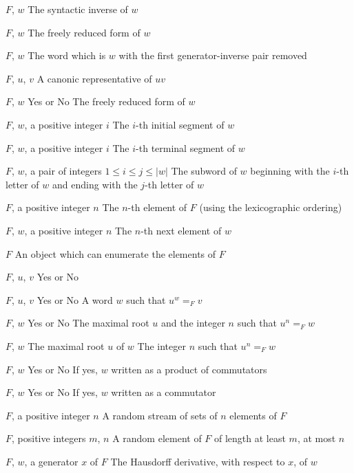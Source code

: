 \begin{enumerate}

{$F$, $w$}
{The syntactic inverse of $w$}

{$F$, $w$}
{The freely reduced form of $w$}

{$F$, $w$}
{The word which is $w$ with the first generator-inverse pair removed}

{$F$, $u$, $v$}
{A canonic representative of $uv$}

{$F$, $w$}
{Yes or No}
{The freely reduced form of $w$}

{$F$, $w$, a positive integer $i$}
{The $i$-th initial segment of $w$}

{$F$, $w$, a positive integer $i$}
{The $i$-th terminal segment of $w$}

{$F$, $w$, a pair of integers $1\leq i\leq j \leq |w|$}
{The subword of $w$ beginning with the
$i$-th letter of $w$ and ending with the $j$-th letter of $w$
}

{$F$, a positive integer $n$}
{The $n$-th element of $F$ (using the lexicographic ordering)}

{$F$, $w$, a positive integer $n$}
{The $n$-th next element of $w$}

{$F$}
{An object which can enumerate the elements of $F$}

{$F$, $u$, $v$}
{Yes or No}

{$F$, $u$, $v$}
{Yes or No}
{A word $w$ such that $u^w=_F v$}

{$F$, $w$}
{Yes or No}
{The maximal root $u$ and the integer $n$ such that $u^n =_F w$}

{$F$, $w$}
{The maximal root $u$ of $w$}
{The integer $n$ such that $u^n =_F w$}

{$F$, $w$}
{Yes or No}
{If yes, $w$ written as a product of commutators}

{$F$, $w$}
{Yes or No}
{If yes, $w$ written as a commutator}

{$F$, a positive integer $n$}
{A random stream of sets of $n$ elements of $F$}

{$F$, positive integers $m$, $n$}
{A random element of $F$ of length at least $m$, at most $n$}

{$F$, $w$, a generator $x$ of $F$}
{The Hausdorff derivative, with respect to $x$, of $w$}

\end{enumerate}


